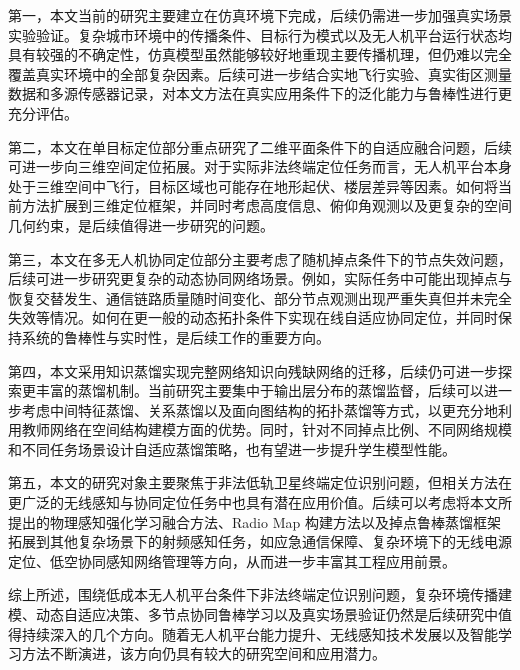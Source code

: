 第一，本文当前的研究主要建立在仿真环境下完成，后续仍需进一步加强真实场景实验验证。复杂城市环境中的传播条件、目标行为模式以及无人机平台运行状态均具有较强的不确定性，仿真模型虽然能够较好地重现主要传播机理，但仍难以完全覆盖真实环境中的全部复杂因素。后续可进一步结合实地飞行实验、真实街区测量数据和多源传感器记录，对本文方法在真实应用条件下的泛化能力与鲁棒性进行更充分评估。

第二，本文在单目标定位部分重点研究了二维平面条件下的自适应融合问题，后续可进一步向三维空间定位拓展。对于实际非法终端定位任务而言，无人机平台本身处于三维空间中飞行，目标区域也可能存在地形起伏、楼层差异等因素。如何将当前方法扩展到三维定位框架，并同时考虑高度信息、俯仰角观测以及更复杂的空间几何约束，是后续值得进一步研究的问题。

第三，本文在多无人机协同定位部分主要考虑了随机掉点条件下的节点失效问题，后续可进一步研究更复杂的动态协同网络场景。例如，实际任务中可能出现掉点与恢复交替发生、通信链路质量随时间变化、部分节点观测出现严重失真但并未完全失效等情况。如何在更一般的动态拓扑条件下实现在线自适应协同定位，并同时保持系统的鲁棒性与实时性，是后续工作的重要方向。

第四，本文采用知识蒸馏实现完整网络知识向残缺网络的迁移，后续仍可进一步探索更丰富的蒸馏机制。当前研究主要集中于输出层分布的蒸馏监督，后续可以进一步考虑中间特征蒸馏、关系蒸馏以及面向图结构的拓扑蒸馏等方式，以更充分地利用教师网络在空间结构建模方面的优势。同时，针对不同掉点比例、不同网络规模和不同任务场景设计自适应蒸馏策略，也有望进一步提升学生模型性能。

第五，本文的研究对象主要聚焦于非法低轨卫星终端定位识别问题，但相关方法在更广泛的无线感知与协同定位任务中也具有潜在应用价值。后续可以考虑将本文所提出的物理感知强化学习融合方法、Radio Map 构建方法以及掉点鲁棒蒸馏框架拓展到其他复杂场景下的射频感知任务，如应急通信保障、复杂环境下的无线电源定位、低空协同感知网络管理等方向，从而进一步丰富其工程应用前景。

综上所述，围绕低成本无人机平台条件下非法终端定位识别问题，复杂环境传播建模、动态自适应决策、多节点协同鲁棒学习以及真实场景验证仍然是后续研究中值得持续深入的几个方向。随着无人机平台能力提升、无线感知技术发展以及智能学习方法不断演进，该方向仍具有较大的研究空间和应用潜力。
